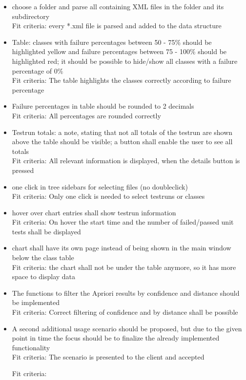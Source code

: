 \begin{itemize}

\item choose a folder and parse all containing XML files in the folder and its subdirectory\\
Fit criteria: every *.xml file is parsed and added to the data structure

\item Table: classes with failure percentages between 50 - 75\% should be highlighted yellow and failure percentages between 75 - 100\% should be highlighted red; it should be possible to hide/show all classes with a failure percentage of 0\%\\
Fit criteria: The table highlights the classes correctly according to failure percentage
\item Failure percentages in table should be rounded to 2 decimals\\
Fit criteria: All percentages are rounded correctly
\item Testrun totals: a note, stating that not all totals of the testrun are shown above the table should be visible; a button shall enable the user to see all totals\\
Fit criteria: All relevant information is displayed, when the details button is pressed

\item one click in tree sidebars for selecting files (no doubleclick)\\
Fit criteria: Only one click is needed to select testruns or classes
\item hover over chart entries shall show testrun information\\
Fit criteria: On hover the start time and the number of failed/passed unit tests shall be displayed
\item chart shall have its own page instead of being shown in the main window below the class table\\
Fit criteria: the chart shall not be under the table anymore, so it has more space to display data
\item The functions to filter the Apriori results by confidence and distance should be implemented\\
Fit criteria: Correct filtering of confidence and by distance shall be possible

\item A second additional usage scenario should be proposed, but due to the given point in time the focus should be to finalize the already implemented functionality\\
Fit criteria: The scenario is presented to the client and accepted


Fit criteria: 

\end{itemize}


